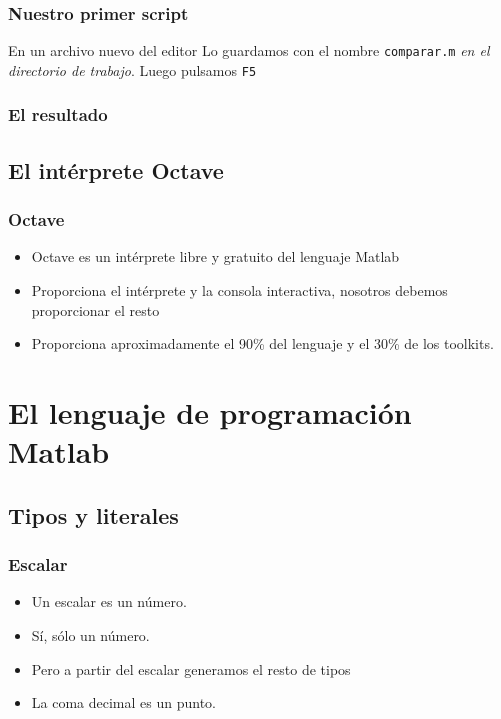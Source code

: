 \documentclass[12pt]{beamer}
\begin{document}

\begin{frame}
\frametitle{Nuestro primer script}
En un archivo nuevo del editor
\testcode
Lo guardamos con el nombre \texttt{comparar.m} \emph{en el directorio
  de trabajo}. Luego pulsamos \texttt{F5}
\end{frame}


\begin{frame}
\frametitle{El resultado}
  \begin{figure}[h]
    \centering{}
  \end{figure}
\end{frame}

\subsection{El intérprete Octave}
\begin{frame}
  \frametitle{Octave}
  \begin{itemize}
  \item Octave es un intérprete libre y gratuito del lenguaje Matlab
  \item Proporciona el intérprete y la consola interactiva, nosotros
    debemos proporcionar el resto
  \item Proporciona aproximadamente el 90\% del lenguaje y el 30\% de
    los toolkits.
  \end{itemize}
\end{frame}

\section{El lenguaje de programación Matlab}
\subsection{Tipos y literales}

\begin{frame}
  \frametitle{Escalar}
  \begin{itemize}
  \item Un escalar es un número.
    \pause
  \item Sí, sólo un número.
  \item Pero a partir del escalar generamos el resto de tipos
  \item La coma decimal es un punto.
  \end{itemize}
  \testcode
\end{frame}
\end{document}
